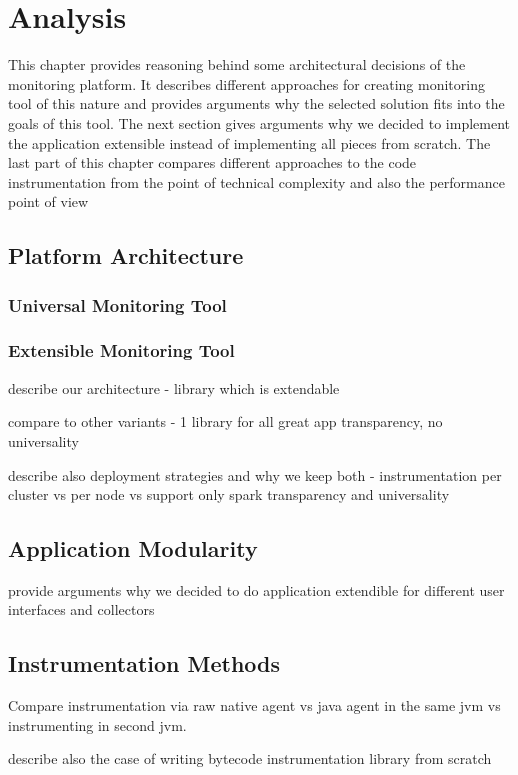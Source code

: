 \chapter{Analysis}
This chapter provides reasoning behind some architectural decisions of the monitoring platform. It describes different approaches for creating monitoring tool of this nature and provides arguments why the selected solution fits into the goals of this tool. The next section gives arguments why we decided to implement the application extensible instead of implementing all pieces from scratch. The last part of this chapter compares different approaches to the code instrumentation from the point of technical complexity and also the performance point of view

\section{Platform Architecture}

\subsection{Universal Monitoring Tool}
\subsection{Extensible Monitoring Tool}
describe our architecture - library which is extendable

compare to other variants - 1 library for all great app transparency, no universality


describe also deployment strategies and why we keep both - instrumentation per cluster vs per node
vs support only spark transparency and universality

\section{Application Modularity}
provide arguments why we decided to do application extendible for different user interfaces and collectors
\section{Instrumentation Methods}

Compare instrumentation via raw native agent vs java agent in the same jvm vs instrumenting in second jvm.

describe also the case of writing bytecode instrumentation library from scratch

